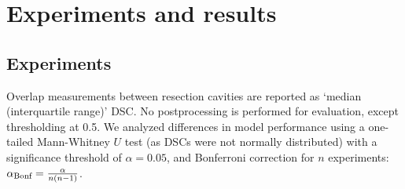 \section{Experiments and results}
\label{sec:experiments_and_results}






\subsection{Experiments}

Overlap measurements between resection cavities are reported as `median (interquartile range)' \acf{DSC}.
No postprocessing is performed for evaluation, except thresholding at 0.5.
We analyzed differences in model performance using a one-tailed Mann-Whitney $U$ test (as \acp{DSC} were not normally distributed) with a significance threshold of $\alpha = 0.05$, and Bonferroni correction for $n$ experiments: $\alpha_{\text{Bonf}} = \frac{\alpha}{n (n - 1)}$.






